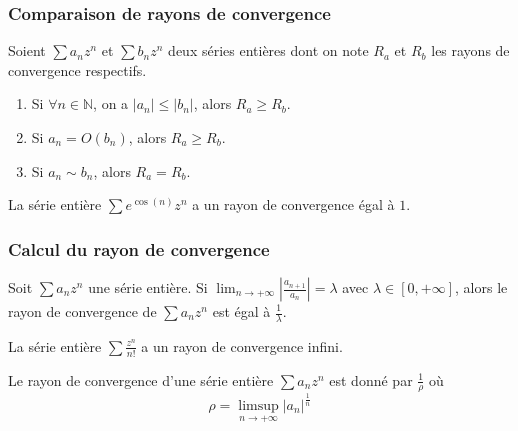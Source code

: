  \subsubsection{Comparaison de rayons de convergence}


  Soient $\sum a_n z^n$ et $\sum b_n z^n$ deux séries entières dont on note $R_a$ et $R_b$ les rayons de convergence respectifs.

  \begin{proposition}
    \begin{enumerate}[label=(\roman*)]
      \item Si $\forall n \in \mathbb{N}$, on a $|a_n| \leq |b_n|$, alors $R_a \geq R_b$.
      \item Si $a_n = O(b_n)$, alors $R_a \geq R_b$.
      \item Si $a_n \sim b_n$, alors $R_a = R_b$.
    \end{enumerate}
  \end{proposition}

  \begin{example}
    La série entière $\sum e^{\cos(n)} z^n$ a un rayon de convergence égal à $1$.
  \end{example}

  \subsubsection{Calcul du rayon de convergence}


  \begin{proposition}
    Soit $\sum a_n z^n$ une série entière. Si $\lim_{n \rightarrow +\infty} \left| \frac{a_{n+1}}{a_n} \right| = \lambda$ avec $\lambda \in [0, +\infty]$, alors le rayon de convergence de $\sum a_n z^n$ est égal à $\frac{1}{\lambda}$.
  \end{proposition}

  \begin{example}
    La série entière $\sum \frac{z^n}{n!}$ a un rayon de convergence infini.
  \end{example}

  \begin{proposition}
    Le rayon de convergence d'une série entière $\sum a_n z^n$ est donné par $\frac{1}{\rho}$ où
    \[ \rho = \limsup_{n \rightarrow +\infty} |a_n|^{\frac{1}{n}} \]
  \end{proposition}

